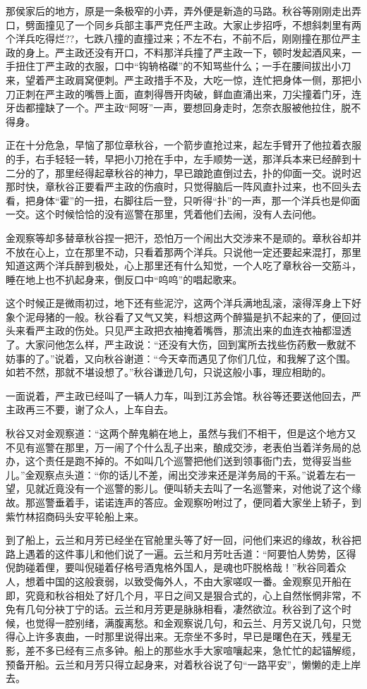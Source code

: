 \documentclass[12pt,UTF8]{ctexbook}
\begin{document}
{{{那侯家后的地方，原是一条极窄的小弄，弄外便是新造的马路。秋谷等刚刚走出弄口，劈面撞见了一个同乡兵部主事严克任严主政。大家止步招呼，不想斜刺里有两个洋兵吃得烂??，七跌八撞的直撞过来；不左不右，不前不后，刚刚撞在那位严主政的身上。严主政还没有开口，不料那洋兵撞了严主政一下，顿时发起酒风来，一手扭住丁严主政的衣服，口中“钩辀格磔”的不知骂些什么；一手在腰间拔出小刀来，望着严主政肩窝便刺。严主政措手不及，大吃一惊，连忙把身体一侧，那把小刀正刺在严主政的嘴唇上面，直刺得唇开肉破，鲜血直涌出来，刀尖撞着门牙，连牙齿都撞缺了一个。严主政“阿呀”一声，要想回身走时，怎奈衣服被他拉住，脱不得身。

正在十分危急，早恼了那位章秋谷，一个箭步直抢过来，起左手臂开了他拉着衣服的手，右手轻轻一转，早把小刀抢在手中，左手顺势一送，那洋兵本来已经醉到十二分的了，那里经得起章秋谷的神力，早已踉跄直倒过去，扑的仰面一交。说时迟那时快，章秋谷正要看严主政的伤痕时，只觉得脑后一阵风直扑过来，也不回头去看，把身体“霍”的一扭，右脚往后一登，只听得“扑”的一声，那一个洋兵也是仰面一交。这个时候恰恰的没有巡警在那里，凭着他们去闹，没有人去问他。

金观察等却多替章秋谷捏一把汗，恐怕万一个闹出大交涉来不是顽的。章秋谷却并不放在心上，立在那里不动，只看着那两个洋兵。只说他一定还要起来混打，那里知道这两个洋兵醉到极处，心上那里还有什么知觉，一个人吃了章秋谷一交筋斗，睡在地上也不扒起身来，倒反口中“呜呜”的唱起歌来。

这个时候正是微雨初过，地下还有些泥泞，这两个洋兵满地乱滚，滚得浑身上下好象个泥母猪的一般。秋谷看了又气又笑，料想这两个醉猫是扒不起来的了，便回过头来看严主政的伤处。只见严主政把衣袖掩着嘴唇，那流出来的血连衣袖都湿透了。大家问他怎么样，严主政说：“还没有大伤，回到寓所去找些伤药敷一敷就不妨事的了。”说着，又向秋谷谢道：“今天幸而遇见了你们几位，和我解了这个围。如若不然，那就不堪设想了。”秋谷谦逊几句，只说这般小事，理应相助的。

一面说着，严主政已经叫了一辆人力车，叫到江苏会馆。秋谷等还要送他回去，严主政再三不要，谢了众人，上车自去。

秋谷又对金观察道：“这两个醉鬼躺在地上，虽然与我们不相干，但是这个地方又不见有巡警在那里，万一闹了个什么乱子出来，酿成交涉，老表伯当着洋务局的总办，这个责任是跑不掉的。不如叫几个巡警把他们送到领事衙门去，觉得妥当些儿。”金观察点头道：“你的话儿不差，闹出交涉来还是洋务局的干系。”说着左右一望，见就近竟没有一个巡警的影儿。便叫轿夫去叫了一名巡警来，对他说了这个缘故。那巡警垂着手，诺诺连声的答应。金观察吩咐过了，便同着大家坐上轿子，到紫竹林招商码头安平轮船上来。

到了船上，云兰和月芳已经坐在官舱里头等了好一回，问他们来迟的缘故，秋谷把路上遇着的这件事儿和他们说了一遍。云兰和月芳吐舌道：“阿要怕人势势，区得倪韵碰着俚，要叫倪碰着仔格号酒鬼格外国人，是魂也吓脱格哉！”秋谷同着众人，想着中国的这般衰弱，以致受侮外人，不由大家嗟叹一番。金观察见开船在即，究竟和秋谷相处了好几个月，平日之间又是狠合式的，心上自然怅惘非常，不免有几句分袂丁宁的话。云兰和月芳更是脉脉相看，凄然欲泣。秋谷到了这个时候，也觉得一腔别绪，满腹离愁。和金观察说几句，和云兰、月芳又说几句，只觉得心上许多衷曲，一时那里说得出来。无奈坐不多时，早已是曙色在天，残星无影，差不多已经有三点多钟。船上的那些水手大家喧嚷起来，急忙忙的起锚解缆，预备开船。云兰和月芳只得立起身来，对着秋谷说了句“一路平安”，懒懒的走上岸去。

}}}
\end{document}
